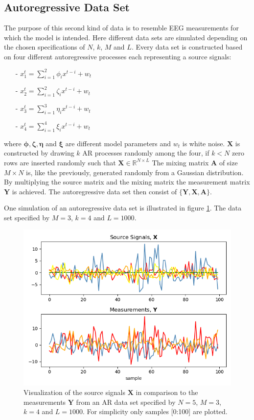\subsection{Autoregressive Data Set}
The purpose of this second kind of data is to resemble EEG measurements for which the model is intended. Here different data sets are simulated depending on the chosen specifications of $N$, $k$, $M$ and $L$. 
Every data set is constructed based on four different autoregressive processes each representing a source signals:
\begin{itemize}
\item[-] $x_{1}^{t} = \sum_{i=1}^{2} \phi_i x^{t-i} + w_t$
\item[-] $x_{2}^{t} = \sum_{i=1}^{2} \zeta_i x^{t-i} + w_t$
\item[-] $x_{3}^{t} = \sum_{i=1}^{3} \eta_i x^{t-i} + w_t$
\item[-] $x_{4}^{t} = \sum_{i=1}^{4} \xi_i x^{t-i} + w_t$
\end{itemize}
where $\boldsymbol{\phi},\boldsymbol{\zeta},\boldsymbol{\eta}$ and $\boldsymbol{\xi}$ are different model parameters and $w_t$ is white noise.
$\textbf{X}$ is constructed by drawing $k$ AR processes randomly among the four, if $k<N$ zero rows are inserted randomly such that $\textbf{X}\in \mathbb{R}^{N \times L}$  
The mixing matrix $\mathbf{A}$ of size $M \times N$ is, like the previously, generated randomly from a Gaussian distribution.
By multiplying the source matrix and the mixing matrix the measurement matrix $\mathbf{Y}$ is achieved.
The autoregressive data set then consist of $\{ \mathbf{Y}, \mathbf{X}, \mathbf{A} \}$. 

One simulation of an autoregressive data set is illustrated in figure \ref{fig:AR}. The data set specified by $M = 3$, $k = 4$ and $L = 1000$.
\begin{figure}[H]
\centering
\includegraphics[scale=0.5]{figures/ch_6/AR_data.png}
\caption{Visualization of the source signals $\textbf{X}$ in comparison to the measurements $\mathbf{Y}$ from an AR data set specified by $N=5$, $M = 3$, $k=4$ and $L=1000$. For simplicity only samples [0:100] are plotted.}
\label{fig:AR}
\end{figure}
\noindent

